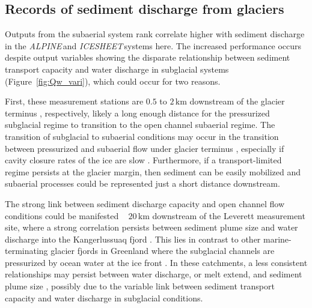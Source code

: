 \documentclass[11pt]{article}
\newcommand{\alpine}{\textit{ALPINE}\,}
\newcommand{\icesheet}{\textit{ICESHEET}\,}
\newcommand{\unit}[1]{$\mathrm{#1}$}
\begin{document}


\subsection{Records of sediment discharge  from glaciers}

Outputs from the subaerial system rank correlate higher with sediment discharge in the \alpine and \icesheet systems here.
The increased performance occurs despite  output variables showing the disparate relationship between sediment transport capacity and water discharge in subglacial systems (Figure~\ref{fig:Qw_vari}), which could occur for two reasons.

First, these measurement stations are $0.5$ to $2$\,\unit{km} downstream of the glacier terminus \citep{cowton2012,felix2022}, respectively, likely a long enough distance for the pressurized subglacial regime to transition to the open channel subaerial regime.
The transition of subglacial to subaerial conditions may occur in the transition between pressurized and subaerial flow under glacier terminus \citep{perolo2018}, especially if cavity closure rates of the ice are slow  \citep{egli2021b}.
Furthermore,  if a transport-limited regime persists at the glacier margin, then sediment can be easily mobilized and subaerial processes could be represented just a short distance downstream.

The strong link between sediment discharge capacity and open channel flow conditions could be manifested ~ $20$\,\unit{km} downstream of the Leverett measurement site, where a strong correlation persists between sediment plume size and water discharge into the Kangerlussuaq fjord \citep{mcgrath2010}.
This lies in contrast to other marine-terminating glacier fjords in Greenland where the subglacial channels are pressurized by ocean water at the ice front \citep[e.g.][]{how2017}. 
In these catchments, a less consistent relationships may persist between water discharge, or melt extend, and sediment plume size \citep{tedstone2012}, possibly due to the variable link between sediment transport capacity and water discharge in subglacial conditions.
\end{document}
